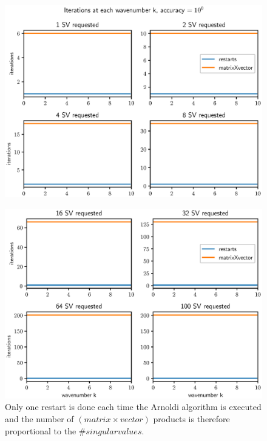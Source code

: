 \documentclass[a4paper, oneside]{discothesis}
\begin{document}
\begin{figure} [H]
	\centering
	\includegraphics[width=0.9\columnwidth]{figures/arnoldi_iter_1e2_1.eps}
	\label{fig:arnoldi_iter_1e2_1}
\end{figure}
\begin{figure} [H]
	\centering
	\includegraphics[width=0.9\columnwidth]{figures/arnoldi_iter_1e2_2.eps}
	\caption{
		Only one restart is done each time the Arnoldi algorithm is executed and the number of $(matrix\times vector)$ products is therefore proportional to the $\#singularvalues$.
	}
	\label{fig:arnoldi_iter_1e2_2}
\end{figure}
\end{document}
